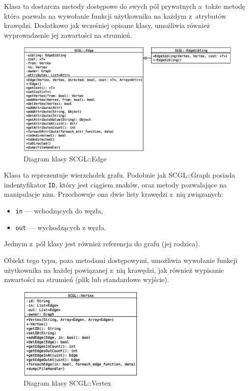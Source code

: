 \documentclass[a4paper,12pt,polish,oneside,openright]{thesis}
\newcommand\code[1]{\lstinline[style=line]{#1}}
\begin{document}
\begin{description}
	Klasa ta dostarcza metody dostępowe do swych pól prywatnych a~także metodę która pozwala na wywołanie funkcji użytkownika na każdym z~atrybutów krawędzi.
	Dodatkowo jak wcześniej opisane klasy, umożliwia również wyprowadzenie jej zawartości na strumień.
	\begin{figure}[htb]
	\begin{center}
		\includegraphics[width=1.00\textwidth]{gfx/class_edge.eps}
		\caption{Diagram klasy SCGL::Edge}
	\end{center}
	\end{figure}

	\item[SCGL::Vertex]
	Klasa ta reprezentuje wierzchołek grafu.
	Podobnie jak SCGL::Graph posiada indentyfikator \code{ID}, który jest ciągiem znaków, oraz metody pozwalające na manipulacje nim.
	Przechowuje ona dwie listy krawędzi z~nią związanych:
	\begin{itemize}
		\item \code{in} --- wchodzących do węzła,
		\item \code{out} --- wychodzących z węzła.
	\end{itemize}
	Jednym z~pól klasy jest również referencja do grafu (jej rodzica).

	Obiekt tego typu, poza metodami dostępowymi, umożliwia wywołanie funkcji użytkownika na każdej powiązanej z~nią krawędzi, jak również wypisanie zawartości na strumień (plik lub standardowe wyjście).
	\begin{figure}[htb]
	\begin{center}
		\includegraphics[width=0.55\textwidth]{gfx/class_vertex.eps}
		\caption{Diagram klasy SCGL::Vertex}
	\end{center}
	\end{figure}


\end{description}
\end{document}
